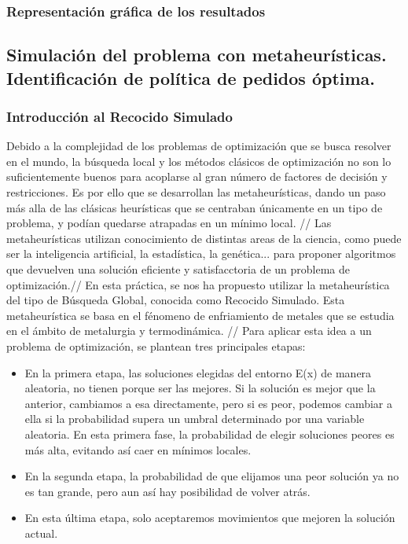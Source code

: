 \documentclass[a4paper,12pt]{article}
\begin{document}
	\subsubsection{Representación gráfica de los resultados}
	
	
	\subsection{Simulación del problema con metaheurísticas. Identificación de política de pedidos óptima.}
	\subsubsection{Introducción al Recocido Simulado}
	Debido a la complejidad de los problemas de optimización que se busca resolver en el mundo, la búsqueda local y los métodos clásicos de optimización
	no son lo suficientemente buenos para acoplarse al gran número de factores de decisión y restricciones. Es por ello que se desarrollan las metaheurísticas,
	dando un paso más alla de las clásicas heurísticas que se centraban únicamente en un tipo de problema, y podían quedarse atrapadas en un mínimo local.
	//
	Las metaheurísticas	utilizan conocimiento de distintas areas de la ciencia, como puede ser la inteligencia artificial, la estadística, la genética... para proponer algoritmos que 
	devuelven una solución eficiente y satisfacctoria de un problema de optimización.//
	En esta práctica, se nos ha propuesto utilizar la metaheurística del tipo de Búsqueda Global, conocida como Recocido Simulado. Esta metaheurística se basa
	en el fénomeno de enfriamiento de metales que se estudia en el ámbito de metalurgia y termodinámica. //
	Para aplicar esta idea a un problema de optimización, se plantean tres principales etapas:
	\begin{itemize}
		\item En la primera etapa, las soluciones elegidas del entorno E(x) de manera aleatoria, no tienen porque ser las mejores. Si la solución
		es mejor que la anterior, cambiamos a esa directamente, pero si es peor, podemos cambiar a ella si la probabilidad supera un umbral determinado por
		una variable aleatoria. En esta primera fase, la probabilidad de elegir soluciones peores es más alta, evitando así caer en mínimos locales.
		\item En la segunda etapa, la probabilidad de que elijamos una peor solución ya no es tan grande, pero aun así hay posibilidad de volver atrás.
		\item En esta última etapa, solo aceptaremos movimientos que mejoren la solución actual.
	\end{itemize}
	
\end{document}
